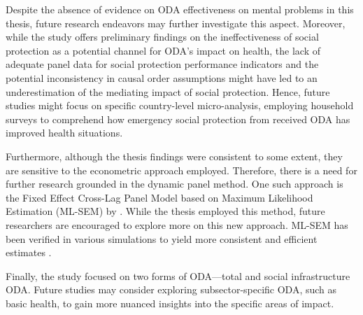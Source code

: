 Despite the absence of evidence on ODA effectiveness on mental problems in this thesis, future research endeavors may further investigate this aspect. Moreover, while the study offers preliminary findings on the ineffectiveness of social protection as a potential channel for ODA's impact on health, the lack of adequate panel data for social protection performance indicators and the potential inconsistency in causal order assumptions might have led to an underestimation of the mediating impact of social protection. Hence, future studies might focus on specific country-level micro-analysis, employing household surveys to comprehend how emergency social protection from received ODA has improved health situations.

Furthermore, although the thesis findings were consistent to some extent, they are sensitive to the econometric approach employed. Therefore, there is a need for further research grounded in the dynamic panel method. One such approach is the Fixed Effect Cross-Lag Panel Model based on Maximum Likelihood Estimation (ML-SEM) by \textcite{allison2017maximum}. While the thesis employed this method, future researchers are encouraged to explore more on this new approach. ML-SEM has been verified in various simulations to yield more consistent and efficient estimates \parencite[see][]{moral2019dynamic, becker2023many, allison2017maximum}.

Finally, the study focused on two forms of ODA—total and social infrastructure ODA. Future studies may consider exploring subsector-specific ODA, such as basic health, to gain more nuanced insights into the specific areas of impact.

